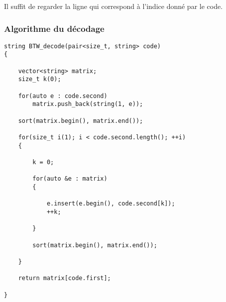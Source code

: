 
\par Il suffit de regarder la ligne qui correspond à l'indice donné par le code.


\subsubsection{Algorithme du décodage}
\begin{verbatim}
string BTW_decode(pair<size_t, string> code)
{
	
	vector<string> matrix;
	size_t k(0);
	
	for(auto e : code.second)
		matrix.push_back(string(1, e));
		
	sort(matrix.begin(), matrix.end());
	
	for(size_t i(1); i < code.second.length(); ++i)
	{
		
		k = 0;
		
		for(auto &e : matrix)
		{
			
			e.insert(e.begin(), code.second[k]);
			++k;
			
		}

		sort(matrix.begin(), matrix.end());
		
	}

	return matrix[code.first];
	
}
\end{verbatim}